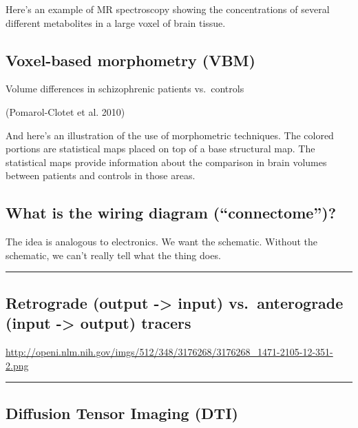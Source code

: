 \documentclass[]{article}
\begin{document}
Here's an example of MR spectroscopy showing the concentrations of
several different metabolites in a large voxel of brain tissue.

\subsection{Voxel-based morphometry
(VBM)}\label{voxel-based-morphometry-vbm}

Volume differences in schizophrenic patients vs.~controls

(Pomarol-Clotet et al. 2010)

And here's an illustration of the use of morphometric techniques. The
colored portions are statistical maps placed on top of a base structural
map. The statistical maps provide information about the comparison in
brain volumes between patients and controls in those areas.

\subsection{\texorpdfstring{What is the wiring diagram
(``connectome'')?}{What is the wiring diagram (connectome)?}}\label{what-is-the-wiring-diagram-connectome}

The idea is analogous to electronics. We want the schematic. Without the
schematic, we can't really tell what the thing does.

\begin{center}\rule{0.5\linewidth}{\linethickness}\end{center}

\subsection{Retrograde (output -\textgreater{} input) vs.~anterograde
(input -\textgreater{} output)
tracers}\label{retrograde-output---input-vs.anterograde-input---output-tracers}

\url{http://openi.nlm.nih.gov/imgs/512/348/3176268/3176268_1471-2105-12-351-2.png}

\begin{center}\rule{0.5\linewidth}{\linethickness}\end{center}

\subsection{Diffusion Tensor Imaging
(DTI)}\label{diffusion-tensor-imaging-dti}
\end{document}
